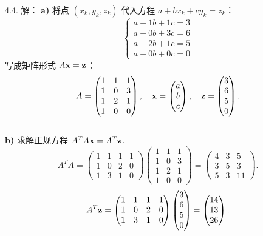 \begin{exer}
4.4. 解：
\textbf{a)} 将点 $(x_k, y_k, z_k)$ 代入方程 $a + bx_k + cy_k = z_k$：
$$
\begin{cases}
a + 1b + 1c = 3 \\
a + 0b + 3c = 6 \\
a + 2b + 1c = 5 \\
a + 0b + 0c = 0
\end{cases}
$$
写成矩阵形式 $A\mathbf{x} = \mathbf{z}$：
$$ A = \begin{pmatrix} 1 & 1 & 1 \\ 1 & 0 & 3 \\ 1 & 2 & 1 \\ 1 & 0 & 0 \end{pmatrix}, \quad \mathbf{x} = \begin{pmatrix} a \\ b \\ c \end{pmatrix}, \quad \mathbf{z} = \begin{pmatrix} 3 \\ 6 \\ 5 \\ 0 \end{pmatrix}. $$
\\
\textbf{b)} 求解正规方程 $A^T A \mathbf{x} = A^T \mathbf{z}$.
$$ A^T A = \begin{pmatrix} 1 & 1 & 1 & 1 \\ 1 & 0 & 2 & 0 \\ 1 & 3 & 1 & 0 \end{pmatrix} \begin{pmatrix} 1 & 1 & 1 \\ 1 & 0 & 3 \\ 1 & 2 & 1 \\ 1 & 0 & 0 \end{pmatrix} = \begin{pmatrix} 4 & 3 & 5 \\ 3 & 5 & 3 \\ 5 & 3 & 11 \end{pmatrix}. $$
$$ A^T \mathbf{z} = \begin{pmatrix} 1 & 1 & 1 & 1 \\ 1 & 0 & 2 & 0 \\ 1 & 3 & 1 & 0 \end{pmatrix} \begin{pmatrix} 3 \\ 6 \\ 5 \\ 0 \end{pmatrix} = \begin{pmatrix} 14 \\ 13 \\ 26 \end{pmatrix}. $$

\end{exer}
